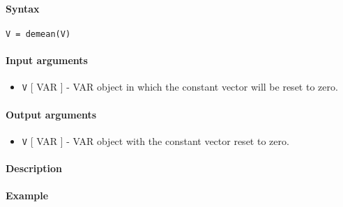 


	\paragraph{Syntax}\label{syntax}

\begin{verbatim}
V = demean(V)
\end{verbatim}

\paragraph{Input arguments}\label{input-arguments}

\begin{itemize}
\itemsep1pt\parskip0pt
\item
  \texttt{V} {[} VAR {]} - VAR object in which the constant vector will
  be reset to zero.
\end{itemize}

\paragraph{Output arguments}\label{output-arguments}

\begin{itemize}
\itemsep1pt\parskip0pt
\item
  \texttt{V} {[} VAR {]} - VAR object with the constant vector reset to
  zero.
\end{itemize}

\paragraph{Description}\label{description}

\paragraph{Example}\label{example}


